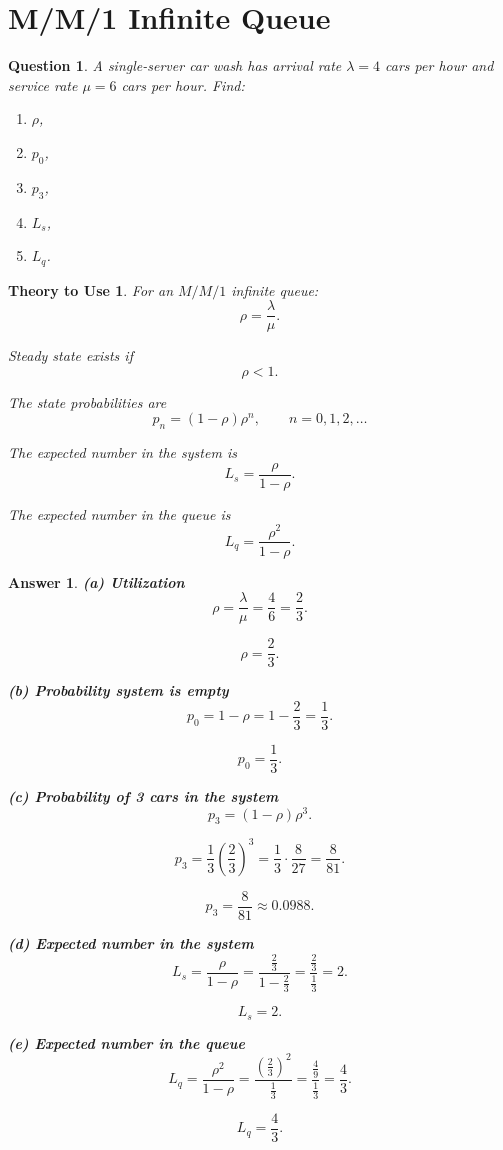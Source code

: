 \documentclass[12pt]{article}
\newtheorem{question}{Question}
\newtheorem*{theory}{Theory to Use}
\newtheorem*{answer}{Answer}
\begin{document}
\section{M/M/1 Infinite Queue}

\begin{question}
A single-server car wash has arrival rate \(\lambda=4\) cars per hour and service rate \(\mu=6\) cars per hour.
Find:
\begin{enumerate}[label=(\alph*)]
    \item \(\rho\),
    \item \(p_0\),
    \item \(p_3\),
    \item \(L_s\),
    \item \(L_q\).
\end{enumerate}
\end{question}

\begin{theory}
For an \(M/M/1\) infinite queue:
\[
\rho=\frac{\lambda}{\mu}.
\]

Steady state exists if
\[
\rho<1.
\]

The state probabilities are
\[
p_n=(1-\rho)\rho^n,\qquad n=0,1,2,\ldots
\]

The expected number in the system is
\[
L_s=\frac{\rho}{1-\rho}.
\]

The expected number in the queue is
\[
L_q=\frac{\rho^2}{1-\rho}.
\]
\end{theory}

\begin{answer}
\textbf{(a) Utilization}
\[
\rho=\frac{\lambda}{\mu}=\frac{4}{6}=\frac{2}{3}.
\]

\[
\boxed{\rho=\frac{2}{3}.}
\]

\textbf{(b) Probability system is empty}
\[
p_0=1-\rho=1-\frac{2}{3}=\frac{1}{3}.
\]

\[
\boxed{p_0=\frac{1}{3}.}
\]

\textbf{(c) Probability of 3 cars in the system}
\[
p_3=(1-\rho)\rho^3.
\]

\[
p_3=\frac{1}{3}\left(\frac{2}{3}\right)^3
=\frac{1}{3}\cdot \frac{8}{27}
=\frac{8}{81}.
\]

\[
\boxed{p_3=\frac{8}{81}\approx 0.0988.}
\]

\textbf{(d) Expected number in the system}
\[
L_s=\frac{\rho}{1-\rho}
=\frac{\frac{2}{3}}{1-\frac{2}{3}}
=\frac{\frac{2}{3}}{\frac{1}{3}}
=2.
\]

\[
\boxed{L_s=2.}
\]

\textbf{(e) Expected number in the queue}
\[
L_q=\frac{\rho^2}{1-\rho}
=\frac{\left(\frac{2}{3}\right)^2}{\frac{1}{3}}
=\frac{\frac{4}{9}}{\frac{1}{3}}
=\frac{4}{3}.
\]

\[
\boxed{L_q=\frac{4}{3}.}
\]
\end{answer}
\end{document}
